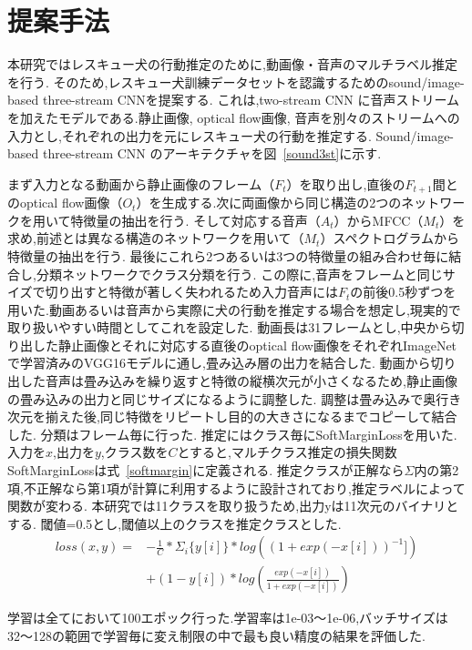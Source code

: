\documentclass[MIRU,submit]{miru2019j}
\begin{document}
\section{提案手法}
本研究ではレスキュー犬の行動推定のために,動画像・音声のマルチラベル推定を行う.
そのため,レスキュー犬訓練データセットを認識するためのsound/image-based three-stream CNNを提案する.
これは,two-stream CNN に音声ストリームを加えたモデルである.静止画像, optical flow画像, 音声を別々のストリームへの入力とし,それぞれの出力を元にレスキュー犬の行動を推定する.
Sound/image-based three-stream CNN のアーキテクチャを図~\ref{sound3st}に示す.

まず入力となる動画から静止画像のフレーム（$F_t$）を取り出し,直後の$F_{t+1}$間とのoptical flow画像（$O_t$）を生成する.次に両画像から同じ構造の2つのネットワークを用いて特徴量の抽出を行う.
そして対応する音声（$A_t$）からMFCC（$M_t$）を求め,前述とは異なる構造のネットワークを用いて（$M_t$）スペクトログラムから特徴量の抽出を行う.
最後にこれら2つあるいは3つの特徴量の組み合わせ毎に結合し,分類ネットワークでクラス分類を行う.
この際に,音声をフレームと同じサイズで切り出すと特徴が著しく失われるため入力音声には$F_t$の前後0.5秒ずつを用いた.動画あるいは音声から実際に犬の行動を推定する場合を想定し,現実的で取り扱いやすい時間としてこれを設定した.
動画長は31フレームとし,中央から切り出した静止画像とそれに対応する直後のoptical flow画像をそれぞれImageNetで学習済みのVGG16モデルに通し,畳み込み層の出力を結合した.
動画から切り出した音声は畳み込みを繰り返すと特徴の縦横次元が小さくなるため,静止画像の畳み込みの出力と同じサイズになるように調整した.
調整は畳み込みで奥行き次元を揃えた後,同じ特徴をリピートし目的の大きさになるまでコピーして結合した.
分類はフレーム毎に行った.
推定にはクラス毎にSoftMarginLossを用いた.
入力を$x$,出力を$y$,クラス数を$C$とすると,マルチクラス推定の損失関数SoftMarginLossは式~\ref{softmargin}に定義される.
推定クラスが正解なら$\Sigma$内の第2項,不正解なら第1項が計算に利用するように設計されており,推定ラベルによって関数が変わる.
本研究では11クラスを取り扱うため,出力yは11次元のバイナリとする.
閾値=0.5とし,閾値以上のクラスを推定クラスとした.
\begin{equation}
    \label{softmargin}
    \begin{split}
    loss(x, y) = &-\frac{1}{C} * \Sigma_{i} \{y[i]\} * log((1+exp(-x[i]))^{-1}])\\
    &+ (1 - y[i]) * log(\frac{exp(-x[i])}{1+exp(-x[i])})
    \end{split}
\end{equation}

学習は全てにおいて100エポック行った.学習率は1e-03〜1e-06,バッチサイズは32〜128の範囲で学習毎に変え制限の中で最も良い精度の結果を評価した.
\end{document}
